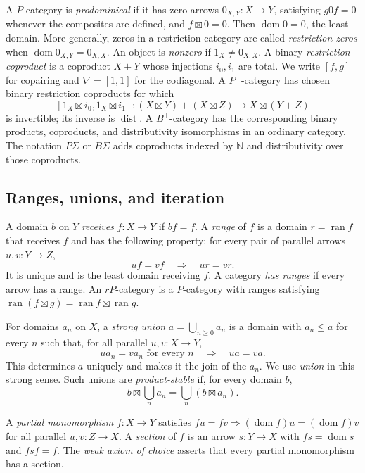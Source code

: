 \documentclass[11pt]{article}
\newcommand{\dom}{\operatorname{dom}}\newcommand{\ran}{\operatorname{ran}}
\newcommand{\dist}{\operatorname{dist}}\newcommand{\ass}{\operatorname{ass}}
\begin{document}
A $P$-category is \emph{prodominical} if it has zero arrows
$0_{X,Y}:X\to Y$, satisfying $g0f=0$ whenever the composites are
defined, and $f\boxtimes0=0$. Then $\dom0=0$, the least domain. More generally, zeros in a restriction category are called \emph{restriction zeros} when $\dom0_{X,Y}=0_{X,X}$.
An object is \emph{nonzero} if $1_X\ne0_{X,X}$.
A binary \emph{restriction coproduct} is a coproduct $X+Y$ whose
injections $i_0,i_1$ are total. We write $[f,g]$ for copairing and
$\nabla=[1,1]$ for the codiagonal. A $P^+$-category has chosen
binary restriction coproducts for which
\[
 [1_X\boxtimes i_0,1_X\boxtimes i_1]:
 (X\boxtimes Y)+(X\boxtimes Z)\longrightarrow X\boxtimes(Y+Z)
\]
is invertible; its inverse is $\dist$. A $B^+$-category has the
corresponding binary products, coproducts, and distributivity
isomorphisms in an ordinary category. The notation $P\Sigma$ or
$B\Sigma$ adds coproducts indexed by $\mathbb N$ and distributivity
over those coproducts.

\subsection{Ranges, unions, and iteration}
A domain $b$ on $Y$ \emph{receives} $f:X\to Y$ if $bf=f$.
A \emph{range} of $f$ is a domain $r=\ran f$ that receives $f$
and has the following property: for every pair of parallel arrows
$u,v:Y\to Z$,
\[
 uf=vf\quad\Longrightarrow\quad ur=vr.
\]
It is unique and is the least domain receiving $f$. A category
\emph{has ranges} if every arrow has a range. An $rP$-category is
a $P$-category with ranges satisfying
$\ran(f\boxtimes g)=\ran f\boxtimes\ran g$.

For domains $a_n$ on $X$, a \emph{strong union}
$a=\bigcup_{n\geq0}a_n$ is a domain with $a_n\leq a$ for every
$n$ such that, for all parallel $u,v:X\to Y$,
\[
 ua_n=va_n\text{ for every }n
 \quad\Longrightarrow\quad ua=va.
\]
This determines $a$ uniquely and makes it the join of the $a_n$.
We use \emph{union} in this strong sense. Such unions are
\emph{product-stable} if, for every domain $b$,
\[
 b\boxtimes\bigcup_n a_n=\bigcup_n(b\boxtimes a_n).
\]

A \emph{partial monomorphism} $f:X\to Y$ satisfies
$fu=fv\Longrightarrow(\dom f)u=(\dom f)v$ for all parallel
$u,v:Z\to X$. A \emph{section} of $f$ is an arrow $s:Y\to X$
with $fs=\dom s$ and $fsf=f$. The \emph{weak axiom of choice}
asserts that every partial monomorphism has a section.
\end{document}

